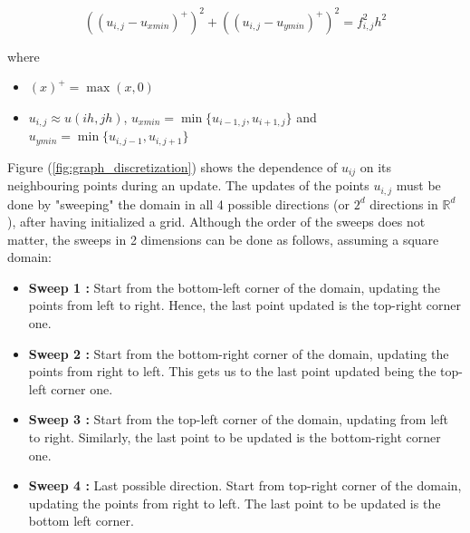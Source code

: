 \documentclass[11pt]{article}
\theoremstyle{definition}
\theoremstyle{remark}
\begin{document}
\begin{equation*}
    ((u_{i,j}-u_{xmin})^{+})^2+((u_{i,j}-u_{ymin})^{+})^2 = f_{i,j}^{2}h^2
\end{equation*}

\noindent where
\begin{itemize}
    \item $(x)^{+} = \max(x,0)$
    \item $u_{i,j}\approx u(ih,jh)$, $u_{xmin} = \min\{u_{i-1,j},u_{i+1,j}\}$ and $u_{ymin} = \min\{u_{i,j-1},u_{i,j+1}\}$
\end{itemize}

\noindent Figure (\ref{fig:graph_discretization}) shows the dependence of $u_{ij}$ on its neighbouring points during an update. The updates of the points $u_{i,j}$ must be done by "sweeping" the domain in all 4 possible directions (or $2^d$ directions in $\mathbb{R}^d$), after having initialized a grid. Although the order of the sweeps does not matter, the sweeps in 2 dimensions can be done as follows, assuming a square domain:
\begin{itemize}
    \item \textbf{Sweep 1 : } Start from the bottom-left corner of the domain, updating the points from left to right. Hence, the last point updated is the top-right corner one.
    \item \textbf{Sweep 2 : } Start from the bottom-right corner of the domain, updating the points from right to left. This gets us to the last point updated being the top-left corner one.
    \item  \textbf{Sweep 3 : } Start from the top-left corner of the domain, updating from left to right. Similarly, the last point to be updated is the bottom-right corner one.
    \item \textbf{Sweep 4 : } Last possible direction. Start from top-right corner of the domain, updating the points from right to left. The last point to be updated is the bottom left corner.
\end{itemize}
\end{document}
